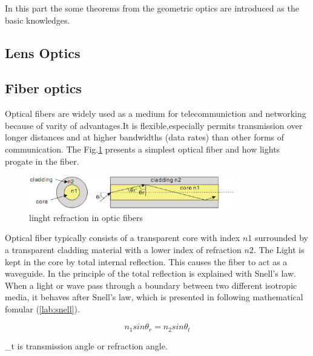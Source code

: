 In this part the  some theorems from the geometric optics  are introduced as the basic knowledges.

\subsection{Lens Optics}


\subsection{Fiber optics}
Optical fibers are widely used as a medium for telecommuniction and networking because of varity of advantages.It is flexible,especially permits transmission over longer distances and at higher bandwidths (data rates) than other forms of communication. The Fig.\ref{fig:opticfiber} presents a simplest optical fiber and how lights progate in the fiber. 

\begin{figure}[httbp]
\centering
\includegraphics[width=0.8\textwidth]{bilder/opticfiber}
\caption{linght refraction in optic fibers}
\label{fig:opticfiber}
\end{figure}

Optical fiber typically consists of a transparent core with index $n1$ surrounded by a transparent cladding material with a lower index of refraction $n2$. The Light is kept in the core by total internal reflection. This causes the fiber to act as a waveguide.
In \cite{script_FT_TET} the principle of the total reflection is explained with Snell's law. When a light or wave pass through a boundary between two different isotropic media, it behaves after Snell's law, which is presented in following mathematical fomular (\ref{lab:snell}).

\begin{equation}
n_{1}sin\theta_{r}=n_{2}sin\theta_{t}
\label{lab:snell}
\end{equation}



\theta_{t} is transmission angle or refraction angle.